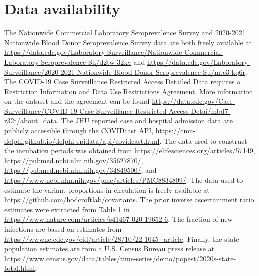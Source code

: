 \documentclass{article}
\begin{document}









\section*{Data availability}

The Nationwide Commercial Laboratory Seroprevalence Survey 
and 2020-2021 Nationwide Blood Donor Seroprevalence Survey 
data are both freely available at
\href{https://data.cdc.gov/Laboratory-Surveillance/Nationwide-Commercial-Laboratory-Seroprevalence-Su/d2tw-32xv}{https://data.cdc.gov/Laboratory-Surveillance/Nationwide-Commercial-Laboratory-Seroprevalence-Su/d2tw-32xv} 
and 
\href{https://data.cdc.gov/Laboratory-Surveillance/2020-2021-Nationwide-Blood-Donor-Seroprevalence-Su/mtc3-kq6r}{https://data.cdc.gov/Laboratory-Surveillance/2020-2021-Nationwide-Blood-Donor-Seroprevalence-Su/mtc3-kq6r}. 
The COVID-19 Case Surveillance Restricted Access Detailed Data 
requires a Restriction Information and Data Use Restrictions 
Agreement. More information on the dataset and the agreement 
can be found \href{https://data.cdc.gov/Case-Surveillance/COVID-19-Case-Surveillance-Restricted-Access-Detai/mbd7-r32t/about\_data}{https://data.cdc.gov/Case-Surveillance/COVID-19-Case-Surveillance-Restricted-Access-Detai/mbd7-r32t/about\_data}. 
The JHU reported case and hospital admission data are 
publicly accessible through the COVIDcast API, 
\href{https://cmu-delphi.github.io/delphi-epidata/api/covidcast.html}{https://cmu-delphi.github.io/delphi-epidata/api/covidcast.html}. 
The data used to construct the incubation periods was obtained from \newline
\href{https://elifesciences.org/articles/57149}{https://elifesciences.org/articles/57149}, 
\href{https://pubmed.ncbi.nlm.nih.gov/35627870/}{https://pubmed.ncbi.nlm.nih.gov/35627870/}, \newline
\href{https://pubmed.ncbi.nlm.nih.gov/34849500/}{https://pubmed.ncbi.nlm.nih.gov/34849500/}, 
and \href{https://www.ncbi.nlm.nih.gov/pmc/articles/PMC8834809/}{https://www.ncbi.nlm.nih.gov/pmc/articles/PMC8834809/}. 
The data used to estimate the variant proportions in circulation is freely 
available at \newline \href{https://github.com/hodcroftlab/covariants}{https://github.com/hodcroftlab/covariants}. 
The prior inverse ascertainment ratio estimates were extracted from Table 1 in
 \href{https://www.nature.com/articles/s41467-020-19652-6}{https://www.nature.com/articles/s41467-020-19652-6}. 
 The fraction of new infections are based on estimates from \href{https://wwwnc.cdc.gov/eid/article/28/10/22-1045\_article}{https://wwwnc.cdc.gov/eid/article/28/10/22-1045\_article}. 
Finally, the state population estimates are from a U.S. Census Bureau press release at \href{https://www.census.gov/data/tables/time-series/demo/popest/2020s-state-total.html}{https://www.census.gov/data/tables/time-series/demo/popest/2020s-state-total.html}.
\end{document}
